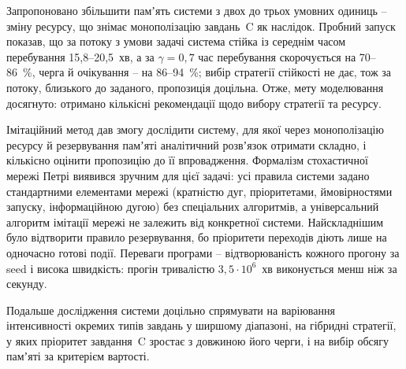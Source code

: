Запропоновано збільшити памʼять системи з двох до трьох умовних одиниць -- зміну ресурсу, що
знімає монополізацію завдань~C як наслідок. Пробний запуск
показав, що за потоку з умови задачі система стійка із середнім часом
перебування 15,8--20,5~хв, а за $\gamma = 0{,}7$ час перебування скорочується на 70--86~\%,
черга й очікування -- на 86--94~\%; вибір стратегії стійкості не дає, тож за
потоку, близького до заданого, пропозиція доцільна. Отже, мету моделювання
досягнуто: отримано кількісні рекомендації щодо вибору стратегії та ресурсу.

Імітаційний метод дав змогу дослідити систему, для якої через монополізацію ресурсу й
резервування памʼяті аналітичний розвʼязок отримати складно, і кількісно оцінити пропозицію до
її впровадження. Формалізм стохастичної мережі Петрі виявився зручним для цієї задачі: усі
правила системи задано стандартними елементами мережі (кратністю дуг, пріоритетами,
ймовірностями запуску, інформаційною дугою) без спеціальних алгоритмів, а універсальний алгоритм
імітації мережі не залежить від конкретної системи. Найскладнішим було відтворити правило
резервування, бо пріоритети переходів діють лише на одночасно готові події.
Переваги програми -- відтворюваність кожного прогону за seed і висока швидкість: прогін
тривалістю $3{,}5\cdot10^6$~хв виконується менш ніж за секунду.

Подальше дослідження системи доцільно спрямувати на варіювання інтенсивності окремих типів
завдань у ширшому діапазоні, на гібридні стратегії, у яких пріоритет завдання~C зростає з
довжиною його черги, і на вибір обсягу памʼяті за критерієм вартості.
